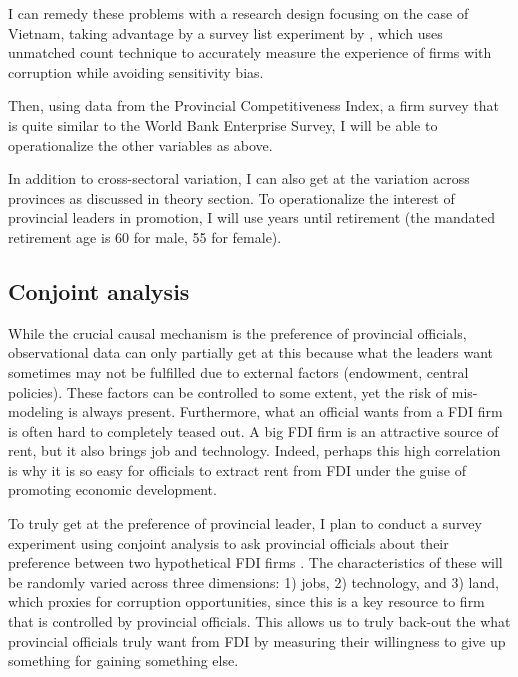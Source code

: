 \documentclass[12pt]{article}
\begin{document}
I can remedy these problems with a research design focusing on the case of Vietnam, taking advantage by a survey list experiment by \citet{Malesky2015}, which uses unmatched count technique to accurately measure the experience of firms with corruption while avoiding sensitivity bias.

Then, using data from the Provincial Competitiveness Index, a firm survey that is quite similar to the World Bank Enterprise Survey, I will be able to operationalize the other variables as above.

In addition to cross-sectoral variation, I can also get at the variation across provinces as discussed in theory section. To operationalize the interest of provincial leaders in promotion, I will use years until retirement (the mandated retirement age is 60 for male, 55 for female).

\subsection{Conjoint analysis}

While the crucial causal mechanism is the preference of provincial officials, observational data can only partially get at this because what the leaders want sometimes may not be fulfilled due to external factors (endowment, central policies). These factors can be controlled to some extent, yet the risk of mis-modeling is always present. Furthermore, what an official wants from a FDI firm is often hard to completely teased out. A big FDI firm is an attractive source of rent, but it also brings job and technology. Indeed, perhaps this high correlation is why it is so easy for officials to extract rent from FDI under the guise of promoting economic development.

To truly get at the preference of provincial leader, I plan to conduct a survey experiment using conjoint analysis to ask provincial officials about their preference between two hypothetical FDI firms \citep{Hainmueller2014}. The characteristics of these will be randomly varied across three dimensions: 1) jobs, 2) technology, and 3) land, which proxies for corruption opportunities, since this is a key resource to firm that is controlled by provincial officials. This allows us to truly back-out the what provincial officials truly want from FDI by measuring their willingness to give up something for gaining something else.

\clearpage


\end{document}

